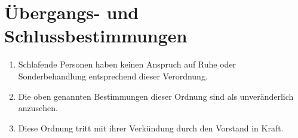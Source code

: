 \documentclass[12pt,a4paper]{scrartcl}
\begin{document}
\section{Übergangs- und Schlussbestimmungen}
\begin{enumerate}
  \item Schlafende Personen haben keinen Anspruch auf Ruhe oder Sonderbehandlung
    entsprechend dieser Verordnung.

  \item Die oben genannten Bestimmungen dieser Ordnung sind als unveränderlich
    anzusehen.

  \item Diese Ordnung tritt mit ihrer Verkündung durch den Vorstand in Kraft.
\end{enumerate}
\end{document}
